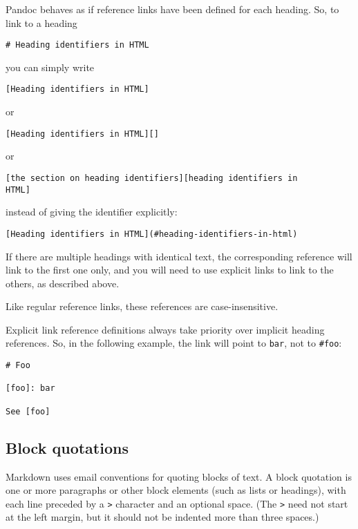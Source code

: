 \documentclass[
]{article}
\begin{document}
Pandoc behaves as if reference links have been defined for each heading.
So, to link to a heading

\begin{verbatim}
# Heading identifiers in HTML
\end{verbatim}

you can simply write

\begin{verbatim}
[Heading identifiers in HTML]
\end{verbatim}

or

\begin{verbatim}
[Heading identifiers in HTML][]
\end{verbatim}

or

\begin{verbatim}
[the section on heading identifiers][heading identifiers in
HTML]
\end{verbatim}

instead of giving the identifier explicitly:

\begin{verbatim}
[Heading identifiers in HTML](#heading-identifiers-in-html)
\end{verbatim}

If there are multiple headings with identical text, the corresponding
reference will link to the first one only, and you will need to use
explicit links to link to the others, as described above.

Like regular reference links, these references are case-insensitive.

Explicit link reference definitions always take priority over implicit
heading references. So, in the following example, the link will point to
\texttt{bar}, not to \texttt{\#foo}:

\begin{verbatim}
# Foo

[foo]: bar

See [foo]
\end{verbatim}

\hypertarget{block-quotations}{%
\subsection{Block quotations}\label{block-quotations}}

Markdown uses email conventions for quoting blocks of text. A block
quotation is one or more paragraphs or other block elements (such as
lists or headings), with each line preceded by a \texttt{\textgreater{}}
character and an optional space. (The \texttt{\textgreater{}} need not
start at the left margin, but it should not be indented more than three
spaces.)
\end{document}
